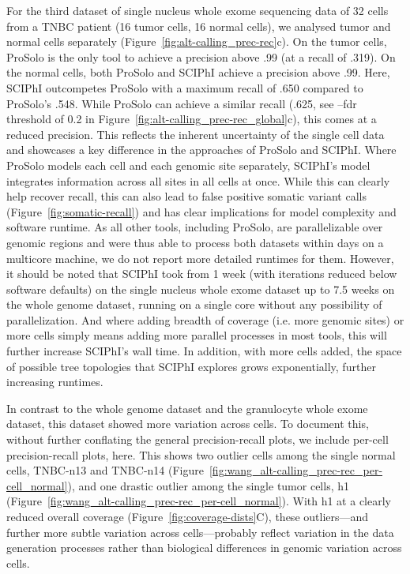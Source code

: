 \documentclass[authoryear,preprint,11pt]{scrartcl}
\begin{document}
For the third dataset of single nucleus whole exome sequencing data of 32 cells from a TNBC patient (16 tumor cells, 16 normal cells), we analysed tumor and normal cells separately (Figure~\ref{fig:alt-calling_prec-rec}c).
On the tumor cells, ProSolo is the only tool to achieve a precision above .99 (at a recall of .319).
On the normal cells, both ProSolo and SCIPhI achieve a precision above .99.
Here, SCIPhI outcompetes ProSolo with a maximum recall of .650 compared to ProSolo's .548.
While ProSolo can achieve a similar recall (.625, see {\ttfamily --fdr} threshold of 0.2 in Figure~\ref{fig:alt-calling_prec-rec_global}c), this comes at a reduced precision.
This reflects the inherent uncertainty of the single cell data and showcases a key difference in the approaches of ProSolo and SCIPhI.
Where ProSolo models each cell and each genomic site separately, SCIPhI's model integrates information across all sites in all cells at once.
While this can clearly help recover recall, this can also lead to false positive somatic variant calls (Figure~\ref{fig:somatic-recall}) and has clear implications for model complexity and software runtime.
As all other tools, including ProSolo, are parallelizable over genomic regions and were thus able to process both datasets within days on a multicore machine, we do not report more detailed runtimes for them.
However, it should be noted that SCIPhI took from 1 week (with iterations reduced below software defaults) on the single nucleus whole exome dataset up to 7.5 weeks on the whole genome dataset, running on a single core without any possibility of parallelization.
And where adding breadth of coverage (i.e. more genomic sites) or more cells simply means adding more parallel processes in most tools, this will further increase SCIPhI's wall time.
In addition, with more cells added, the space of possible tree topologies that SCIPhI explores grows exponentially, further increasing runtimes.

In contrast to the whole genome dataset and the granulocyte whole exome dataset, this dataset showed more variation across cells.
To document this, without further conflating the general precision-recall plots, we include per-cell precision-recall plots, here.
This shows two outlier cells among the single normal cells, TNBC-n13 and TNBC-n14 (Figure~\ref{fig:wang_alt-calling_prec-rec_per-cell_normal}), and one drastic outlier among the single tumor cells, h1 (Figure~\ref{fig:wang_alt-calling_prec-rec_per-cell_normal}).
With h1 at a clearly reduced overall coverage (Figure~\ref{fig:coverage-dists}C), these outliers---and further more subtle variation across cells---probably reflect variation in the data generation processes rather than biological differences in genomic variation across cells.
\end{document}

